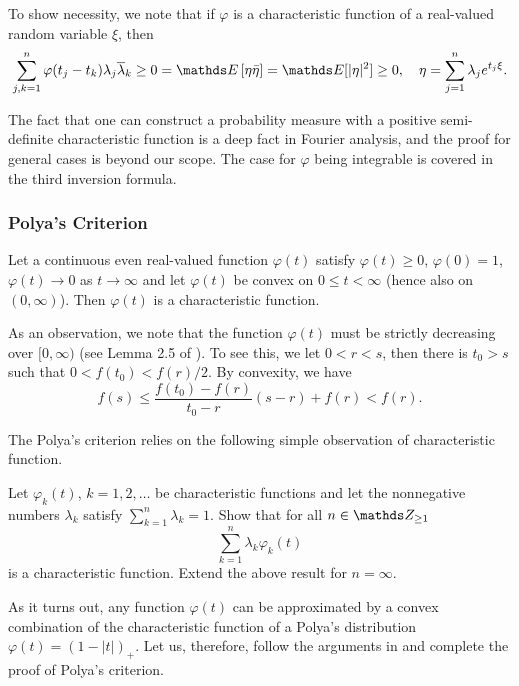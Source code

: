 To show necessity, we note that if $\varphi$ is a characteristic function of a real-valued random variable $\xi$, then 
\begin{equation*}
    \sum_{j,k = 1}^n \varphi(t_j - t_k)\lambda_j \overline{\lambda}_k \ge 0 = \E\sqbracket{\eta\bar{\eta}} = \E[|\eta|^2] \geq 0, \quad \eta = \sum_{j=1}^n \lambda_j e^{t_j \xi}. 
\end{equation*}

The fact that one can construct a probability measure with a positive semi-definite characteristic function is a deep fact in Fourier analysis, and the proof for general cases is beyond our scope. The case for $\varphi$ being integrable is covered in the third inversion formula.

\subsubsection{Polya's Criterion}
\begin{theorem}
Let a continuous even real-valued function $\varphi(t)$ satisfy $\varphi(t) \ge 0$, $\varphi(0) = 1$, $\varphi(t) \to 0$ as $t \to \infty$ and let $\varphi(t)$ be convex on $0 \le t < \infty$ (hence also on $(0, \infty)$). Then $\varphi(t)$ is a characteristic function.
\end{theorem}

As an observation, we note that the function $\varphi(t)$ must be strictly decreasing over $[0,\infty)$ (see Lemma 2.5 of \cite{convex_decay}). To see this, we let $0<r<s$, then there is $t_0 > s$ such that $0<f(t_0)<f(r)/2$. By convexity, we have
\begin{equation*}
    f(s) \leq \frac{f(t_0) - f(r)}{t_0 - r} (s - r) + f(r) < f(r).
\end{equation*}

The Polya's criterion relies on the following simple observation of characteristic function.
\begin{exercise}
Let $\varphi_k(t)$, $k=1,2,\dots$ be characteristic functions and let the nonnegative numbers $\lambda_k$ satisfy $\sum_{k=1}^n \lambda_k = 1$. Show that for all $n \in \Z_{\geq 1}$
\begin{equation*}
    \sum_{k=1}^n \lambda_k \varphi_k(t)
\end{equation*}
is a characteristic function. Extend the above result for $n = \infty$.
\end{exercise}

As it turns out, any function $\varphi(t)$ can be approximated by a convex combination of the characteristic function of a Polya's distribution $\varphi(t) = (1-|t|)_+$. Let us, therefore, follow the arguments in \cite{Billingsley} and complete the proof of Polya's criterion.

